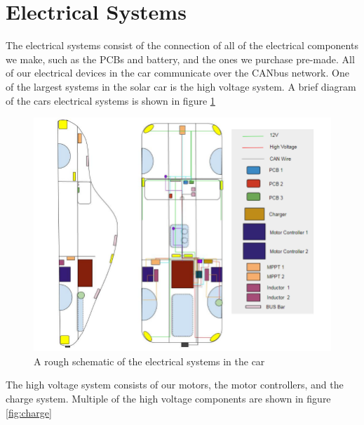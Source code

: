 \documentclass{article}
\begin{document}
    \section{Electrical Systems}
    The electrical systems consist of the connection of all of the
    electrical components we make, such as the PCBs and battery, and the
    ones we purchase pre-made. All of our electrical devices in the car
    communicate over the CANbus network. One of the largest systems in
    the solar car is the high voltage system. A brief diagram of the
    cars electrical systems is shown in figure \ref{fig:systems}
    \begin{figure}[H]
        \centering
        \includegraphics[width=\textwidth]{images/AllWiring.png}
        \caption{A rough schematic of the electrical systems in the car}
        \label{fig:systems}
    \end{figure}
    The high voltage system consists of our motors, the motor
    controllers, and the charge system. Multiple of the high voltage
    components are shown in figure \ref{fig:charge}
\end{document}
